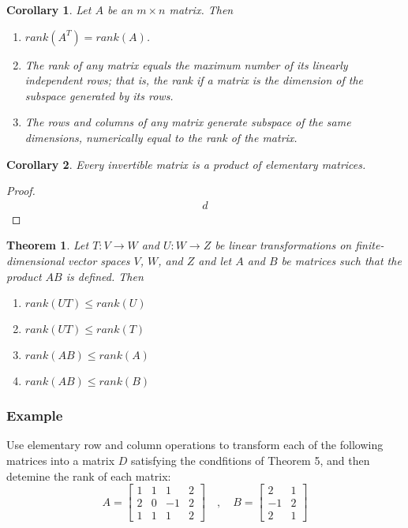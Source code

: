 \documentclass[10pt, oneside]{article}
\newtheorem{thm}{Theorem}
\newtheorem{cor}{Corollary}
\begin{document}
\begin{cor}
	Let $A$ be an $m \times n$ matrix. Then
	\begin{enumerate}
		\item $rank(A^T) = rank(A)$.
		\item The rank of any matrix equals the maximum number of its linearly independent rows; that is, the rank if a matrix is the dimension of the subspace generated by its rows.
		\item The rows and columns of  any matrix generate subspace of the same dimensions, numerically equal to the rank of the matrix.
	\end{enumerate}
\end{cor}

\begin{cor}
	Every invertible matrix is a product of elementary matrices.
\end{cor}

\begin{proof}
	\begin{align*}
		d
	\end{align*}
\end{proof}

\begin{thm}
	Let $T:V \to W$ and $U:W \to Z$ be linear transformations on finite-dimensional vector spaces $V$, $W$, and $Z$ and let $A$ and $B$ be matrices such that the product $AB$ is defined.
	Then
	\begin{enumerate}
		\item $rank(UT) \leq rank(U)$
		\item $rank(UT) \leq rank(T)$
		\item $rank(AB) \leq rank(A)$
		\item $rank(AB) \leq rank(B)$
	\end{enumerate}
\end{thm}

\subsubsection{Example}
Use elementary row and column operations to transform each of the following matrices into a matrix $D$ satisfying the condfitions of Theorem 5, and then detemine the rank of each matrix:
\[
	A = \begin{bmatrix} 1 & 1 & 1 & 2 \\ 2 & 0 & -1 & 2 \\ 1 & 1 & 1 & 2 \end{bmatrix} \quad , \quad B = \begin{bmatrix} 2 & 1 \\ -1 & 2 \\ 2 & 1 \end{bmatrix}
\]
\end{document}
